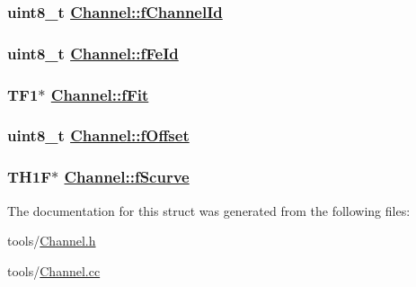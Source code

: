\hypertarget{struct_channel_6bf2beaaef75ac318efdda6c63fd14d4}{
\subsubsection[fChannelId]{\setlength{\rightskip}{0pt plus 5cm}uint8\_\-t \hyperlink{struct_channel_6bf2beaaef75ac318efdda6c63fd14d4}{Channel::f\-Channel\-Id}}}
\label{struct_channel_6bf2beaaef75ac318efdda6c63fd14d4}


\hypertarget{struct_channel_05c28fbcfbe6afc306791e57c14ee90f}{
\subsubsection[fFeId]{\setlength{\rightskip}{0pt plus 5cm}uint8\_\-t \hyperlink{struct_channel_05c28fbcfbe6afc306791e57c14ee90f}{Channel::f\-Fe\-Id}}}
\label{struct_channel_05c28fbcfbe6afc306791e57c14ee90f}


\hypertarget{struct_channel_5ca62453f01642d2b85ab4d24acf5783}{
\subsubsection[fFit]{\setlength{\rightskip}{0pt plus 5cm}TF1$\ast$ \hyperlink{struct_channel_5ca62453f01642d2b85ab4d24acf5783}{Channel::f\-Fit}}}
\label{struct_channel_5ca62453f01642d2b85ab4d24acf5783}


\hypertarget{struct_channel_40a902cc52cb9d00f537094d3944a121}{
\subsubsection[fOffset]{\setlength{\rightskip}{0pt plus 5cm}uint8\_\-t \hyperlink{struct_channel_40a902cc52cb9d00f537094d3944a121}{Channel::f\-Offset}}}
\label{struct_channel_40a902cc52cb9d00f537094d3944a121}


\hypertarget{struct_channel_cc4d3eaf08d6c4951f3ae678000ff684}{
\subsubsection[fScurve]{\setlength{\rightskip}{0pt plus 5cm}TH1F$\ast$ \hyperlink{struct_channel_cc4d3eaf08d6c4951f3ae678000ff684}{Channel::f\-Scurve}}}
\label{struct_channel_cc4d3eaf08d6c4951f3ae678000ff684}




The documentation for this struct was generated from the following files:\begin{CompactItemize}
\item 
tools/\hyperlink{_channel_8h}{Channel.h}\item 
tools/\hyperlink{_channel_8cc}{Channel.cc}\end{CompactItemize}
